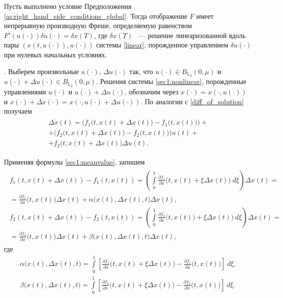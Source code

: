 \documentclass[../main.tex]{subfiles}
\begin{document}
	\begin{lemma}\label{FrechetDerivative}
		Пусть выполнено условие Предположения \ref{as:right_hand_side_conditions_global}.  Тогда отображение $F$ имеет непрерывную производную Фреше, определяемую равенством $ F'(u(\cdot))\delta u(\cdot) =\delta x(T)$, где $\delta x(T)$ ~--- решение линеаризованной вдоль пары $\left( x(t,u(\cdot)),u(\cdot)\right)  $ системы \eqref{linear}, порожденное управлением $\delta u(\cdot)$ при нулевых начальных условиях.
	\end{lemma}
	\doc. 
	Выберем произвольные $u(\cdot)$, $\Delta u(\cdot)$ так, что $ u(\cdot) \in B_{\mathbb{L}_2}(0,\mu)$ и $ u(\cdot) +  \Delta u(\cdot) \in B_{\mathbb{L}_2}(0,\mu)$. Решения системы \eqref{sec1:nonlinear}, порожденные управлениями  $u(\cdot)$ и $u(\cdot) + \Delta u(\cdot)$, обозначим через  $x(\cdot) = x(\cdot,u(\cdot))$ и $ x(\cdot) + \Delta x(\cdot) = x(\cdot, u(\cdot) + \Delta u(\cdot))$. По аналогии с \eqref{diff_of_solution} получаем
	\begin{gather}\label{sec1:dx}
		\begin{gathered}
			\Delta \dot{x}(t) =
			\Big( f_1\big(t, x(t)+\Delta x(t)\big) - f_1\big(t, x(t)\big) \Big)  +  \\ + 
			 \Big( f_2\big(t, x(t)+\Delta x(t)\big) - f_2\big(t,x(t)\big) \Big) u(t)  + \\ +
			 f_2\big(t, x(t)+\Delta x(t)\big)  \Delta u(t) . 
		\end{gathered}
	\end{gather}
	
	Применяя формулы  \eqref{sec1:meanvalue}, запишем 
	\begin{gather*}
		\begin{gathered}
			f_1(t, x(t)+\Delta x(t)) - f_1(t, x(t)) = \left(  \int\limits_0^1 \frac{\partial f_1}{\partial x} \Big(t, x(t) + \xi \Delta x(t)\Big) \ d\xi \right) \Delta x(t) =  \\  = \frac{\partial f_1}{\partial x} \Big(t, x(t)\Big)  \Delta x(t) + \alpha\Big(x(t),\Delta x(t), t\Big) \Delta x(t), \\ 
			f_2(t, x(t)+\Delta x(t)) - f_2(t, x(t)) = \left(  \int\limits_0^1 \frac{\partial f_2}{\partial x} \Big(t, x(t)) + \xi \Delta x(t)\Big) \ d\xi \right) \Delta x(t)=  \\  = \frac{\partial f_2}{\partial x} \Big(t, x(t)\Big)  \Delta x(t) + \beta\Big(x(t),\Delta x(t), t\Big) \Delta x(t), 
		\end{gathered}
	\end{gather*}
	где 
	\begin{gather*}
		\alpha\Big(x(t),\Delta x(t), t\Big) = 
		  \int\limits_0^1 \left[ \frac{\partial f_1}{\partial x} \Big(t, x(t) + \xi \Delta x(t)\Big)  - \frac{\partial f_1}{\partial x} \Big(t, x(t)\Big)  \right] \ d\xi ,\\
		\beta\Big(x(t),\Delta x(t), t\Big) = 
		  \int\limits_0^1 \left[ \frac{\partial f_2}{\partial x} \Big(t, x(t) + \xi \Delta x(t)\Big)  - \frac{\partial f_2}{\partial x} \Big(t, x(t)\Big)  \right] \ d\xi.
	\end{gather*}
	
\end{document}
